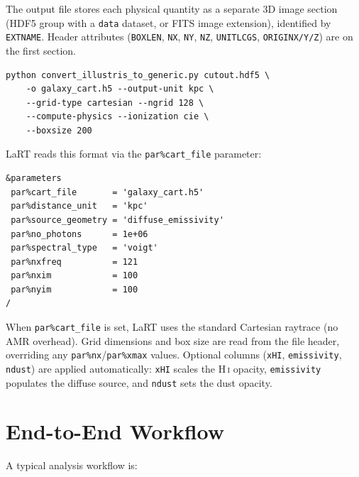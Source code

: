 \documentclass[english,a4paper]{my_memo}
\begin{document}
The output file stores each physical quantity as a separate 3D image
section (HDF5 group with a \texttt{data} dataset, or FITS image
extension), identified by \texttt{EXTNAME}.  Header attributes
(\texttt{BOXLEN}, \texttt{NX}, \texttt{NY}, \texttt{NZ},
\texttt{UNITLCGS}, \texttt{ORIGINX/Y/Z}) are on the first section.

\begin{lstlisting}[style=shellstyle]
python convert_illustris_to_generic.py cutout.hdf5 \
    -o galaxy_cart.h5 --output-unit kpc \
    --grid-type cartesian --ngrid 128 \
    --compute-physics --ionization cie \
    --boxsize 200
\end{lstlisting}

LaRT reads this format via the \texttt{par\%cart\_file} parameter:

\begin{lstlisting}[style=fortranstyle]
&parameters
 par%cart_file       = 'galaxy_cart.h5'
 par%distance_unit   = 'kpc'
 par%source_geometry = 'diffuse_emissivity'
 par%no_photons      = 1e+06
 par%spectral_type   = 'voigt'
 par%nxfreq          = 121
 par%nxim            = 100
 par%nyim            = 100
/
\end{lstlisting}

When \texttt{par\%cart\_file} is set, LaRT uses the standard Cartesian
raytrace (no AMR overhead).  Grid dimensions and box size are read from
the file header, overriding any \texttt{par\%nx}/\texttt{par\%xmax}
values.  Optional columns (\texttt{xHI}, \texttt{emissivity},
\texttt{ndust}) are applied automatically: \texttt{xHI} scales the
H\,\textsc{i} opacity, \texttt{emissivity} populates the diffuse
source, and \texttt{ndust} sets the dust opacity.


\section{End-to-End Workflow}
\label{sec:workflow}

A typical analysis workflow is:
\end{document}
